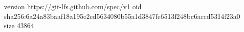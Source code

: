 version https://git-lfs.github.com/spec/v1
oid sha256:6a24a83baaf18a195e2ed5634080b55a1d3847fe6513f248bc6accd5314f23a0
size 43864
